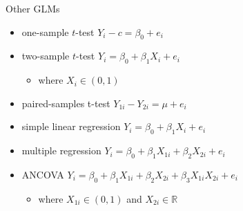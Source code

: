 \documentclass[presentation]{beamer}
\begin{document}
\begin{frame}[label={sec:org8c29850}]{Other GLMs}
\begin{itemize}
\item one-sample \(t\)-test
\(Y_i - c = \beta_0 + e_i\)

\item two-sample \(t\)-test
\(Y_i = \beta_0 + \beta_1 X_i + e_i\)
\begin{itemize}
\item where \(X_i \in \left(0, 1\right)\)
\end{itemize}

\item paired-samples t-test
\(Y_{1i} - Y_{2i} = \mu + e_i\)

\item simple linear regression
\(Y_{i} = \beta_0 + \beta_1 X_i + e_i\)

\item multiple regression
\(Y_{i} = \beta_0 + \beta_1 X_{1i} + \beta_2 X_{2i} + e_i\)

\item ANCOVA
\(Y_{i} = \beta_0 + \beta_1 X_{1i} + \beta_2 X_{2i} + \beta_3 X_{1i} X_{2i} + e_i\)
\begin{itemize}
\item where \(X_{1i} \in \left(0, 1\right)\) and \(X_{2i} \in \mathbb{R}\)
\end{itemize}
\end{itemize}
\end{frame}
\end{document}
